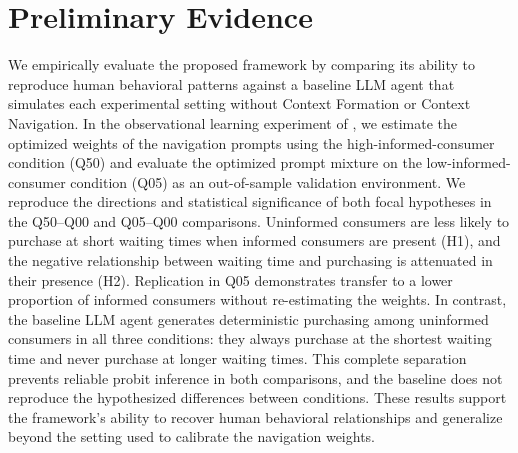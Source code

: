 \documentclass[12pt,letterpaper]{article}
\begin{document}
\section*{\normalsize Preliminary Evidence}
We empirically evaluate the proposed framework by comparing its ability to reproduce
human behavioral patterns against a baseline LLM agent that simulates each experimental
setting without Context Formation or Context Navigation. In the observational
learning experiment of \citet{kremer2016}, we estimate the optimized weights of the
navigation prompts using the high-informed-consumer condition (Q50) and evaluate the optimized prompt mixture on the low-informed-consumer condition (Q05) as an out-of-sample validation environment. We reproduce the directions and statistical significance of both focal hypotheses in the Q50--Q00 and Q05--Q00 comparisons. Uninformed consumers are less likely to purchase at short waiting times when informed consumers are present (H1), and the negative relationship between waiting time and purchasing is attenuated in their presence (H2). Replication in Q05 demonstrates transfer to a lower proportion of informed consumers without re-estimating the weights. In contrast, the baseline LLM agent generates deterministic purchasing among uninformed consumers in all three conditions: they always purchase at the shortest waiting time and never purchase at longer waiting times. This complete separation prevents reliable probit inference in both comparisons, and the baseline does not reproduce the hypothesized differences between conditions. These results support the framework’s ability to recover human behavioral relationships and generalize beyond the setting used to calibrate the navigation weights.
\end{document}
